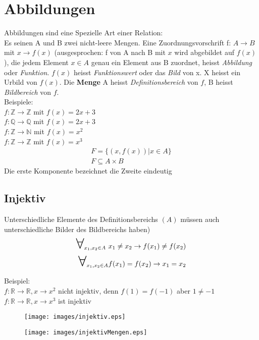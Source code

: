 \documentclass[a4paper]{scrartcl}
\newcommand\bigforall{\mbox{\huge $\forall$}}
\begin{document}
\section{Abbildungen}
Abbildungen sind eine Spezielle Art einer Relation: \\
Es seinen A und B zwei nicht-leere Mengen. Eine Zuordnungsvorschrift f: $A \rightarrow B$ mit $x \rightarrow f(x)$ (ausgesprochen: f von A nach B mit $x$ wird abgebildet auf $f(x)$), die jedem Element $x \in A$ genau ein Element aus B zuordnet, heisst \textit{Abbildung} oder \textit{Funktion}. $f(x)$ heisst \textit{Funktionswert} oder das \textit{Bild} von x. X heisst ein Urbild von $f(x)$.
Die \textbf{Menge}  A heisst \textit{Definitionsbereich} von $f$, B heisst \textit{Bildbereich} von $f$. \\
\newline
Beispiele: \\
$f: \mathbb{Z} \rightarrow \mathbb{Z}$ mit $f(x) = 2x + 3$ \\
$f: \mathbb{Q} \rightarrow \mathbb{Q}$ mit $f(x) = 2x + 3$ \\
$f: \mathbb{Z} \rightarrow \mathbb{N}$ mit $f(x) = x^2$ \\
$f: \mathbb{Z} \rightarrow \mathbb{Z}$ mit $f(x) = x^3$ \\
\newline
\begin{align}
F = \{ (x, f(x)) | x \in A \} \\
F \subseteq A \times B 
\end{align}
Die erste Komponente bezeichnet die Zweite eindeutig
\newpage

\subsection{Injektiv}
Unterschiedliche Elemente des Definitionsbereichs $(A)$ müssen auch unterschiedliche Bilder des Bildbereichs haben)
\begin{align}
\bigforall_{x_1, x_2 \in A} \ x_1 \neq x_2 \rightarrow f(x_1) \neq f(x_2) \\ 
\bigforall_{x_1, x_2 \in A} f(x_1) = f(x_2) \rightarrow x_1 = x_2
\end{align}
Beispiel: \\
$f: \mathbb{R} \rightarrow \mathbb{R}, x \rightarrow x^2$ nicht injektiv, denn $f(1)=f(-1)$ aber $1 \neq -1$ \\
$f: \mathbb{R} \rightarrow \mathbb{R}, x \rightarrow x^3$ ist injektiv
\begin{figure}[h!]
\begin{center}
\texttt{[image: images/injektiv.eps]}
\caption{}
\label{labelname}
\end{center}
\end{figure}
\begin{figure}[h!]
\begin{center}
\texttt{[image: images/injektivMengen.eps]}
\caption{}
\label{labelname}
\end{center}
\end{figure}
\newpage
\end{document}
